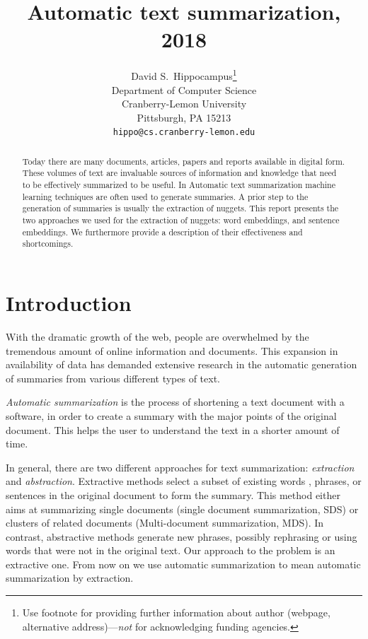 \documentclass{article}
\title{Automatic text summarization, 2018}
\author{
  David S.~Hippocampus\thanks{Use footnote for providing further
    information about author (webpage, alternative
    address)---\emph{not} for acknowledging funding agencies.} \\
  Department of Computer Science\\
  Cranberry-Lemon University\\
  Pittsburgh, PA 15213 \\
  \texttt{hippo@cs.cranberry-lemon.edu} \\
}
\begin{document}

\maketitle


\begin{abstract}
  Today there are many documents, articles, papers and reports available in digital form. These volumes of text are invaluable sources of information and knowledge that need to be effectively summarized to be useful. In Automatic text summarization machine learning techniques are often used to generate summaries. A prior step to the generation of summaries is usually the extraction of nuggets. This report presents the two approaches we used for the extraction of nuggets: word embeddings, and sentence embeddings. We furthermore provide a description of their effectiveness and shortcomings. 
  
\end{abstract}

\section{Introduction}

\label{sec:intro}

With the dramatic growth of the web, people are overwhelmed by the tremendous amount of online information and documents. This expansion in availability of data has demanded extensive research in the automatic generation of summaries from various different types of text.

\textit{Automatic summarization} is the process of shortening a text document with a software, in order to create a summary with the major points of the original document. This helps the user to understand the text in a shorter amount of time.	     

In general, there  are two different approaches for text summarization: \textit{extraction} and \textit{abstraction}. Extractive methods select a subset of existing words , phrases, or sentences in the original document to form the summary. This method either aims at summarizing single documents (single document summarization, SDS) or clusters of related documents (Multi-document summarization, MDS). In contrast, abstractive methods generate new phrases, possibly rephrasing or using words that were not in the original text. Our approach to the problem is an extractive one. From now on we use automatic summarization to mean automatic summarization by extraction. 
\end{document}
